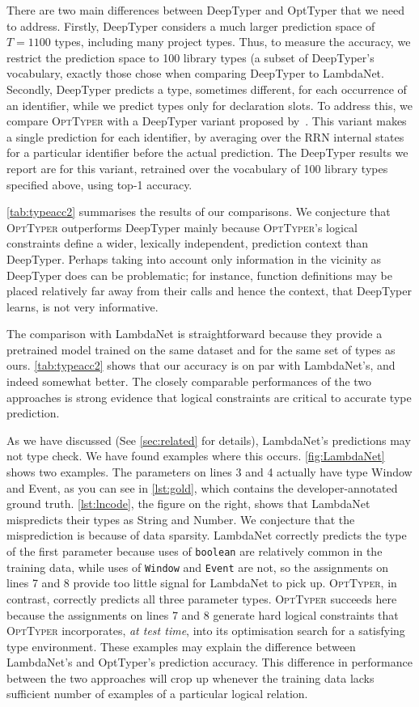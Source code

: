 \documentclass[acmsmall, review, anonymous]{acmart}\settopmatter{printfolios=true,printccs=false,printacmref=false}
\newcommand{\projectname}{\textsc{OptTyper}\xspace}
\begin{document}
There are two main differences between DeepTyper 
and OptTyper that we need to address. Firstly, DeepTyper considers a much larger prediction space of $T=1100$ types, including many project types. Thus, to measure the accuracy, we restrict the prediction space to 100 library types (a subset of DeepTyper's vocabulary, exactly those \citet{wei20} chose when comparing DeepTyper to LambdaNet.
Secondly, DeepTyper predicts a type, sometimes different, for each occurrence of an identifier, while we predict types only for declaration slots. To address this, we compare \projectname{} with a DeepTyper variant proposed by~\citet{wei20}.
This variant makes a single prediction for each identifier, by averaging over the RRN internal states for a particular identifier before the actual prediction.
The DeepTyper results we report are for this variant, retrained over the vocabulary of 100 library types specified above, using top-1 accuracy.

\cref{tab:typeacc2} summarises the results of our comparisons. We conjecture that \projectname outperforms DeepTyper mainly because \projectname's logical constraints define
a wider, lexically independent, prediction context than DeepTyper.
Perhaps taking into account only information in the vicinity as DeepTyper does can be problematic;
for instance, function definitions may be placed relatively far away from their calls and hence the context, that DeepTyper learns, is not very informative.

The comparison with LambdaNet is straightforward because they provide a pretrained model trained on the same dataset and for the same set of types as ours. 
\cref{tab:typeacc2} shows that our accuracy is on par with LambdaNet's, and indeed somewhat better.
The closely comparable performances of the two approaches is strong evidence that logical constraints are critical to accurate type prediction. 

As we have discussed (See \cref{sec:related} for details), 
LambdaNet's predictions may not type check.  We have found examples where this occurs. \cref{fig:LambdaNet} shows two examples.  
The parameters on lines 3 and 4 actually have type Window and Event, as you can see in \cref{lst:gold}, which contains the developer-annotated ground truth.
\cref{lst:lncode}, the figure on the right, shows that LambdaNet mispredicts their types as String and Number.
%
We conjecture that the misprediction is because of data sparsity.
%
LambdaNet correctly predicts the type of the first parameter because uses of \texttt{boolean} are relatively common in the training data, while uses of \texttt{Window} and \texttt{Event} are not, so the assignments on lines 7 and 8 provide too little signal for LambdaNet to pick up.
\projectname, in contrast, correctly predicts all three parameter types.
\projectname succeeds here because the assignments on lines 7 and 8 generate hard logical constraints that \projectname incorporates, \emph{at test time}, into its optimisation search for a satisfying type environment.
These examples may explain the difference between LambdaNet's and OptTyper's prediction accuracy. 
This difference in performance between the two approaches will crop up whenever the training data lacks sufficient number of examples of a particular logical relation.
\end{document}
